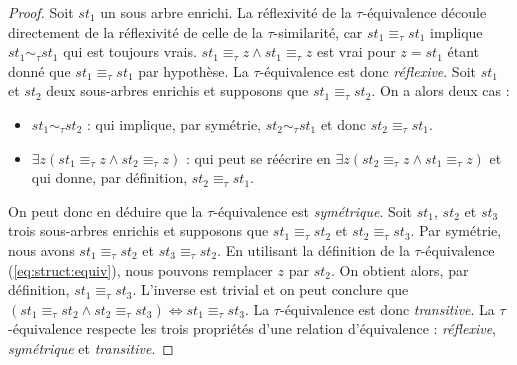 \begin{proof}
    Soit $st_1$ un sous arbre enrichi.
    La réflexivité de la $\tau$-équivalence découle directement de la réflexivité de celle de la $\tau$-similarité, car $st_1 \equiv_\tau st_1$ implique $st_1 \sim_\tau st_1$ qui est toujours vrais.
    $st_1 \equiv_\tau z \land st_1 \equiv_\tau z$ est vrai pour $z = st_1$ étant donné que $st_1 \equiv_\tau st_1$ par hypothèse.
    La $\tau$-équivalence est donc \emph{réflexive}.
    Soit $st_1$ et $st_2$ deux sous-arbres enrichis et supposons que $st_1 \equiv_\tau st_2$.
    On a alors deux cas :
    \begin{itemize}
        \item $st_1 \sim_\tau st_2$ : qui implique, par symétrie, $st_2 \sim_\tau st_1$ et donc $st_2 \equiv_\tau st_1$.
        \item $\exists z (st_1 \equiv_\tau z \land st_2 \equiv_\tau z)$ : qui peut se réécrire en $\exists z (st_2 \equiv_\tau z \land st_1 \equiv_\tau z)$ et qui donne, par définition, $st_2 \equiv_\tau st_1$.
    \end{itemize}
    On peut donc en déduire que la $\tau$-équivalence est \emph{symétrique}.
    Soit $st_1$, $st_2$ et $st_3$ trois sous-arbres enrichis et supposons que $st_1 \equiv_\tau st_2$ et $st_2 \equiv_\tau st_3$.
    Par symétrie, nous avons $st_1 \equiv_\tau st_2$ et $st_3 \equiv_\tau st_2$.
    En utilisant la définition de la $\tau$-équivalence (\ref{eq:struct:equiv}), nous pouvons remplacer $z$ par $st_2$.
    On obtient alors, par définition, $st_1 \equiv_\tau st_3$.
    L'inverse est trivial et on peut conclure que $(st_1 \equiv_\tau st_2 \land st_2 \equiv_\tau st_3) \iff st_1 \equiv_\tau st_3$.
    La $\tau$-équivalence est donc \emph{transitive}.
    La $\tau$-équivalence respecte les trois propriétés d'une relation d'équivalence : \emph{réflexive}, \emph{symétrique} et \emph{transitive}.
\end{proof}

